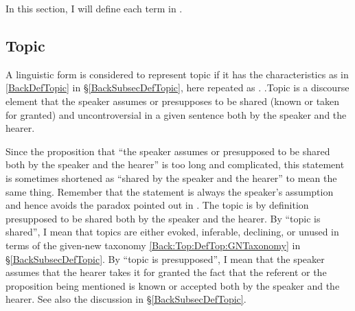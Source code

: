 In this section,
I will define each term in \Last.

\subsection{Topic}\label{FrameworkTopic}

A linguistic form is considered to represent topic
if it has the characteristics as in \ref{BackDefTopic} in \S \ref{BackSubsecDefTopic},
here repeated as \Next.
%
\ex.\label{FrameworkTopicDef}Topic is a discourse element that the speaker assumes or presupposes to be shared (known or taken for granted) and uncontroversial in a given sentence both by the speaker and the hearer.

%
Since the proposition that ``the speaker assumes or presupposed to be shared both by the speaker and the hearer'' is too long and complicated,
this statement is sometimes shortened as ``shared by the speaker and the hearer'' to mean the same thing.
Remember that the statement is always the speaker's assumption
and hence avoids the paradox pointed out in .
The topic is by definition presupposed to be shared both by the speaker and the hearer.
By ``topic is shared'',
I mean that topics are either evoked, inferable, declining, or unused
in terms of the given-new taxonomy \ref{Back:Top:DefTop:GNTaxonomy} in \S \ref{BackSubsecDefTopic}.
By ``topic is presupposed'',
I mean that the speaker assumes that the hearer takes it for granted the fact that the referent or the proposition being mentioned is known or accepted both by the speaker and the hearer.
See also the discussion in \S \ref{BackSubsecDefTopic}.

